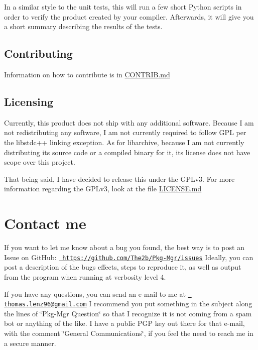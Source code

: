 In a similar style to the unit tests, this will run a few short Python scripts in order to verify the product created by your compiler. Afterwards, it will give you a short summary describing the results of the tests.

\subsection*{Contributing}

Information on how to contribute is in \mbox{\hyperlink{md_CONTRIB}{C\+O\+N\+T\+R\+IB.md}}

\subsection*{Licensing}

Currently, this product does not ship with any additional software. Because I am not redistributing any software, I am not currently required to follow G\+PL per the libstdc++ linking exception. As for libarchive, because I am not currently distributing its source code or a compiled binary for it, its license does not have scope over this project.

That being said, I have decided to release this under the G\+P\+Lv3. For more information regarding the G\+P\+Lv3, look at the file \mbox{\hyperlink{md_LICENSE}{L\+I\+C\+E\+N\+SE.md}}

\section*{Contact me}

If you want to let me know about a bug you found, the best way is to post an Issue on Git\+Hub\+: \href{https://github.com/The2b/Pkg-Mgr/issues}{\texttt{ https\+://github.\+com/\+The2b/\+Pkg-\/\+Mgr/issues}} Ideally, you can post a description of the bug\textquotesingle{}s effects, steps to reproduce it, as well as output from the program when running at verbosity level 4.

If you have any questions, you can send an e-\/mail to me at \href{mailto:thomas.lenz96@gmail.com}{\texttt{ thomas.\+lenz96@gmail.\+com}} I recommend you put something in the subject along the lines of \char`\"{}\+Pkg-\/\+Mgr Question\char`\"{} so that I recognize it is not coming from a spam bot or anything of the like. I have a public P\+GP key out there for that e-\/mail, with the comment \char`\"{}\+General Communications\char`\"{}, if you feel the need to reach me in a secure manner. 